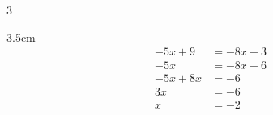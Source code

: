 {\begin{multicols}{3}
\begin{parts}
                        \begin{solutionbox}{3.5cm}\footnotesize%
                            \begin{align*}
                                -5x+9   & =-8x+3 \\
                                -5x     & =-8x-6 \\
                                -5x +8x & =-6    \\
                                3x      & =-6    \\
                                x       & =-2
                            \end{align*}
                        \end{solutionbox}
                    \end{parts}
                \end{multicols}
            }

